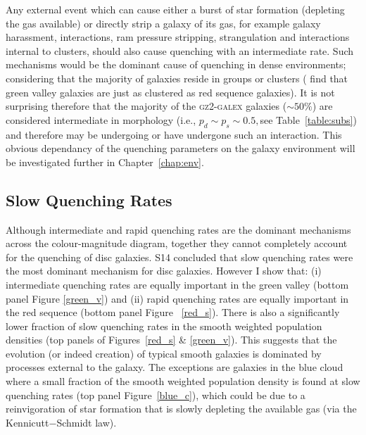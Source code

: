 Any external event which can cause either a burst of star formation (depleting the gas available) or directly strip a galaxy of its gas, for example galaxy harassment, interactions, ram pressure stripping, strangulation and interactions internal to clusters, should also cause quenching with an intermediate rate. Such mechanisms would be the dominant cause of quenching in dense environments; considering that the majority of galaxies reside in groups or clusters (\citealt{Coil08} find that green valley galaxies are just as clustered as red sequence galaxies). It is not surprising therefore that the majority of the \textsc{gz2-galex} galaxies ($\sim50\%$) are considered intermediate in morphology (i.e., $p_d \sim p_s \sim 0.5, $see Table~\ref{table:subs}) and therefore may be undergoing or have undergone such an interaction. This obvious dependancy of the quenching parameters on the galaxy environment will be investigated further in Chapter~\ref{chap:env}.


\subsection{Slow Quenching Rates}\label{slow}

Although intermediate and rapid quenching rates are the dominant mechanisms across the colour-magnitude diagram, together they cannot completely account for the quenching of disc galaxies. S14 concluded that slow quenching rates were the most dominant mechanism for disc galaxies. However I show that: (i) intermediate quenching rates are equally important in the green valley (bottom panel Figure \ref{green_v}) and (ii) rapid quenching rates are equally important in the red sequence (bottom panel Figure ~\ref{red_s}). There is also a significantly lower fraction of slow quenching rates in the smooth weighted population densities (top panels of Figures~\ref{red_s} \& \ref{green_v}). This suggests that the evolution (or indeed creation) of typical smooth galaxies is dominated by processes external to the galaxy. The exceptions are galaxies in the blue cloud where a small fraction of the smooth weighted population density is found at slow quenching rates (top panel Figure~\ref{blue_c}), which could be due to a reinvigoration of star formation that is slowly depleting the available gas (via the Kennicutt$-$Schmidt law).

